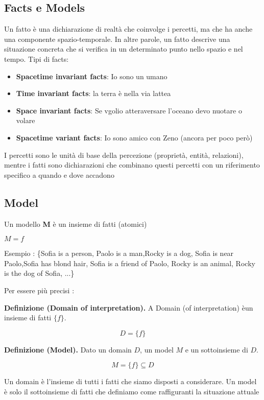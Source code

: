 \documentclass [12pt, letterpaper]{article}
\begin{document}
	
	\subsection{Facts e Models}
	Un fatto è una dichiarazione di realtà che coinvolge i percetti, ma che ha anche una componente spazio-temporale. In altre parole, un fatto descrive una situazione concreta che si verifica in un determinato punto nello spazio e nel tempo.
	Tipi di facts:
	
	\begin{itemize}
		\item \textbf{Spacetime invariant facts}:  Io sono un umano
		\item \textbf{Time invariant facts}: la terra è nella via lattea
		\item \textbf{Space invariant facts}: Se vgolio atteraversare l'oceano devo nuotare o volare 
		\item \textbf{Spacetime variant facts}: Io sono amico con Zeno (ancora per poco però)
	\end{itemize}
	
	I percetti sono le unità di base della percezione (proprietà, entità, relazioni), mentre i fatti sono dichiarazioni che combinano questi percetti con un riferimento specifico a quando e dove accadono
	
	
	\subsection{Model}
	Un modello \textbf{M} è un insieme di fatti (atomici)
		\begin{center}
		$ M = {f} $
		\end{center}
	Esempio : \{Sofia is a person, Paolo is a man,Rocky is a dog,
		Sofia is near Paolo,Sofia has blond hair, Sofia is a friend of Paolo,
		Rocky is an animal, Rocky is the dog of Sofia, ...\} 
		
		
		Per essere più precisi :
	
	\textbf{Definizione (Domain of interpretation).} A Domain (of interpretation) èun insieme di fatti $\{f\}$.
	
	\[
	D = \{f\}
	\]
	

	
	\textbf{Definizione (Model).} Dato un domain $D$, un model $M$ e un sottoinsieme di  $D$.
	
	\[
	M = \{f\} \subseteq D
	\]
		
		

Un domain è l'insieme di tutti i fatti che siamo disposti a considerare. Un model è solo il sottoinsieme di fatti che definiamo come raffiguranti la situazione attuale
\end{document}
